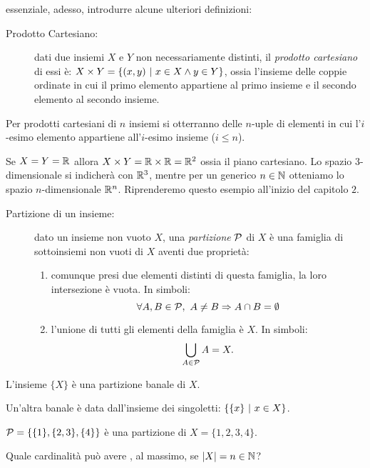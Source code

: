 		\noindent\Egrave essenziale, adesso, introdurre alcune ulteriori definizioni:
		\begin{description}
			\item[Prodotto Cartesiano:] dati due insiemi $X$ e $Y$ non necessariamente distinti, il \emph{prodotto cartesiano} di essi è: $X\times Y=\{(x,y)\ \rvert\  x\in X \land y\in Y\}$, ossia l'insieme delle coppie ordinate in cui il primo elemento appartiene al primo insieme e il secondo elemento al secondo insieme.
		\end{description}
		Per prodotti cartesiani di $n$ insiemi si otterranno delle $n$-uple di elementi in cui l'$i$-esimo elemento appartiene all'$i$-esimo insieme ($i\leq n$).
		\begin{eg}
			Se $X=Y=\mathbb{R}$ allora $X\times Y=\mathbb{R}\times\mathbb{R}=\mathbb{R}^2$ ossia il piano cartesiano. Lo spazio $3$-dimensionale si indicherà con $\mathbb{R}^3$, mentre per un generico $n\in\mathbb{N}$ otteniamo lo spazio $n$-dimensionale $\mathbb{R}^n$. Riprenderemo questo esempio all'inizio del capitolo $2$.
		\end{eg}
		\begin{description}
			\item[Partizione di un insieme:] dato un insieme non vuoto $X$, una \emph{partizione} $\mathcal{P}$ di $X$ è una famiglia di sottoinsiemi non vuoti di $X$ aventi due proprietà:
			\begin{enumerate}
				\item comunque presi due elementi distinti di questa famiglia, la loro intersezione è vuota. In simboli: 
				\begin{equation*} 
					\forall A,B\in\mathcal{P},\ A\neq B\Rightarrow A\cap B=\emptyset 
				\end{equation*}
				\item l'unione di tutti gli elementi della famiglia è $X$. In simboli: \begin{equation*} 
					\bigcup_{A\in\mathcal{P}}A=X.
				\end{equation*}
			\end{enumerate}
		\end{description}
		\begin{eg}
			L'insieme $\{X\}$ è una partizione banale di $X$.
		\end{eg}
		\begin{eg}
			Un'altra banale è data dall'insieme dei singoletti: $\{\{x\}\ \rvert\  x\in X\}$.
		\end{eg}
		\begin{eg}
			$\mathcal{P}=\{\{1\},\{2,3\},\{4\}\}$ è una partizione di $X=\{1,2,3,4\}$.
		\end{eg}
		\begin{es}
			Quale cardinalità può avere \Partizione, al massimo, se $|X|=n\in\mathbb{N}$?
		\end{es}
	
